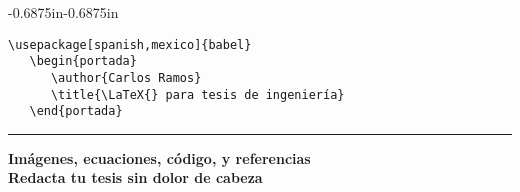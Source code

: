 \documentclass[10pt]{book}
\newcommand{\margenIzquierdo}{0.6875in} %
\newcommand{\margenDerecho}{0.6875in} %
\begin{document}
\begin{titlepage} %
\pagecolor{FondoPortada}
\color{TextoPortada}

\vspace*{2.5cm}

\noindent\scalebox{9}{\textbf{\LaTeX{}}}
\newline\vspace{0.5cm}
\noindent\scalebox{4.5}{para tesis de ingeniería}

\vspace{2.5cm}

\begin{adjustwidth}{-\margenIzquierdo}{-\margenDerecho}

\begin{mdframed}[
	backgroundcolor=FondoCodigoPortada,
	innertopmargin=0pt,
	innerbottommargin=0pt,
	innerrightmargin=0pt,
	innerleftmargin=0pt
]
\begin{lstlisting}[style=portada]
   \usepackage[spanish,mexico]{babel}
   \begin{portada}
      \author{Carlos Ramos}
      \title{\LaTeX{} para tesis de ingeniería}
   \end{portada}
\end{lstlisting}
\end{mdframed}
\end{adjustwidth}

\vspace{2.5cm}

\noindent\rule{0.25\linewidth}{2pt}

\vspace{1.25cm}

\noindent\textbf{\Large
	Imágenes, ecuaciones, código, y referencias
	\\[4pt] %
	Redacta tu tesis sin dolor de cabeza
}

\end{titlepage}

\pagecolor{White}

\end{document}
